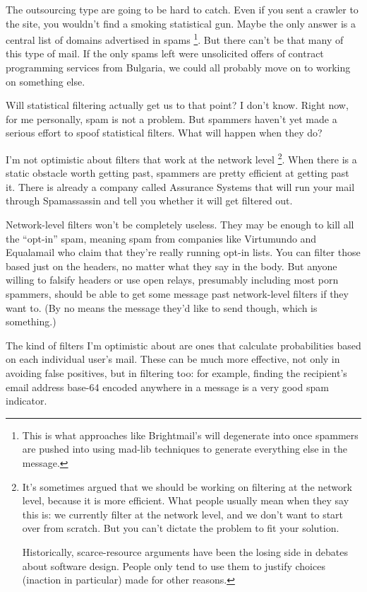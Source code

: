 The outsourcing type are going to be hard to catch. Even if you sent a
crawler to the site, you wouldn't find a smoking statistical gun. Maybe
the only answer is a central list of domains advertised in spams
\footnote{This is what approaches like Brightmail's will degenerate into
once spammers are pushed into using mad-lib techniques to generate
everything else in the message.}. But there can't be that many of this type of mail. If the only
spams left were unsolicited offers of contract programming services from
Bulgaria, we could all probably move on to working on something else.

Will statistical filtering actually get us to that point? I don't know.
Right now, for me personally, spam is not a problem. But spammers
haven't yet made a serious effort to spoof statistical filters. What
will happen when they do?

I'm not optimistic about filters that work at the network level
\footnote{It's sometimes argued that we should be working on filtering at
the network level, because it is more efficient. What people usually
mean when they say this is: we currently filter at the network level,
and we don't want to start over from scratch. But you can't dictate the
problem to fit your solution.

Historically, scarce-resource arguments have been the losing side in
debates about software design. People only tend to use them to justify
choices (inaction in particular) made for other reasons.}. When there is a static obstacle worth getting past, spammers
are pretty efficient at getting past it. There is already a company
called Assurance Systems that will run your mail through Spamassassin
and tell you whether it will get filtered out.

Network-level filters won't be completely useless. They may be enough to
kill all the ``opt-in'' spam, meaning spam from companies like
Virtumundo and Equalamail who claim that they're really running opt-in
lists. You can filter those based just on the headers, no matter what
they say in the body. But anyone willing to falsify headers or use open
relays, presumably including most porn spammers, should be able to get
some message past network-level filters if they want to. (By no means
the message they'd like to send though, which is something.)

The kind of filters I'm optimistic about are ones that calculate
probabilities based on each individual user's mail. These can be much
more effective, not only in avoiding false positives, but in filtering
too: for example, finding the recipient's email address base-64 encoded
anywhere in a message is a very good spam indicator.


